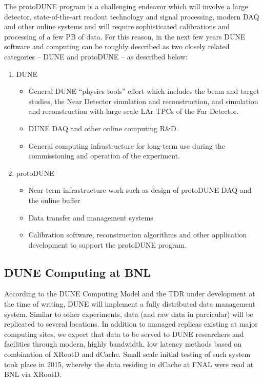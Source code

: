 \documentclass[pdftex,12pt,letter]{article}
\begin{document}
The protoDUNE program is a challenging endeavor which will involve a large detector, state-of-the-art readout technology
and signal processing, modern DAQ and other online systems and will require sophisticated calibrations
and processing of a few PB of data. For this reason, in the next few years DUNE software and computing
can be roughly described as two closely related
categories -- DUNE and protoDUNE -- as described below:
\begin{enumerate}

\item DUNE
\begin{itemize}
\item General DUNE ``physics tools'' effort which includes the beam and target studies, the Near Detector
simulation and reconstruction, and simulation and reconstruction with large-scale LAr TPCs of the Far Detector.

\item DUNE DAQ and other online computing R\&D.

\item General computing infrastructure for long-term use during the commissioning and operation of the experiment.
\end{itemize}

\item protoDUNE
\begin{itemize}
\item Near term infrastructure work such as design of protoDUNE DAQ and the online buffer
\item Data transfer and management systems
\item Calibration software, reconstruction algorithms and other application development to support the protoDUNE program.
\end{itemize}
\end{enumerate}

\subsection{DUNE Computing at BNL}
According to the DUNE Computing Model and the TDR under development at the time of writing,
DUNE will implement a fully distributed data management system. Similar to other experiments,
data (and raw data in parcicular) will be replicated to several locations. In addition to managed
replicas existing at major computing sites, we expect that data to be  served to DUNE
researchers and facilities through modern, highly bandwidth, low
latency methods based on combination of XRootD and dCache. Small scale initial testing
of such system took place in 2015, whereby the data residing in dCache at FNAL were read
at BNL via XRootD.
\end{document}
